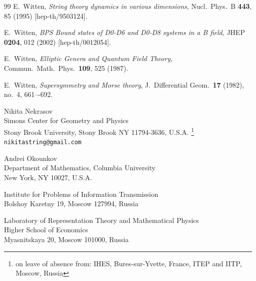 \documentclass[12pt]{article}
\theoremstyle{definition}
\begin{document}
\begin{thebibliography}{99}
  E.~Witten,
  \emph{String theory dynamics in various dimensions,}
  Nucl.\ Phys.\ B {\bf 443}, 85 (1995)
  [hep-th/9503124].


  
  E.~Witten,
 \emph{BPS Bound states of D0-D6 and D0-D8 systems in a B field,}
  JHEP {\bf 0204}, 012 (2002)
  [hep-th/0012054].
  
  
  E.~Witten,
 \emph{Elliptic Genera and Quantum Field Theory,}
  Commun.\ Math.\ Phys.\  {\bf 109}, 525 (1987).
  
E.~Witten, 
\emph{Supersymmetry and Morse theory}, 
 J.\ Differential Geom.\ \textbf{17} (1982), no.~4, 661–-692.  

\end{thebibliography}

\newpage 

\noindent
Nikita Nekrasov\\ 
Simons Center for Geometry and Physics\\ 
Stony Brook University, Stony Brook NY 11794-3636, U.S.A.
\footnote{on leave of absence from:
IHES, Bures-sur-Yvette, France, 
ITEP and IITP, Moscow, Russia}
\\
\texttt{nikitastring@gmail.com} 

\vspace{+10 pt}

\noindent 
Andrei Okounkov\\
Department of Mathematics, Columbia University\\
New York, NY 10027, U.S.A.\\

\vspace{-12 pt}

\noindent 
Institute for Problems of Information Transmission\\
Bolshoy Karetny 19, Moscow 127994, Russia\\


\vspace{-12 pt}

\noindent 
Laboratory of Representation
Theory and Mathematical Physics \\
Higher School of Economics \\ 
Myasnitskaya 20, Moscow 101000, Russia 
\end{document}
